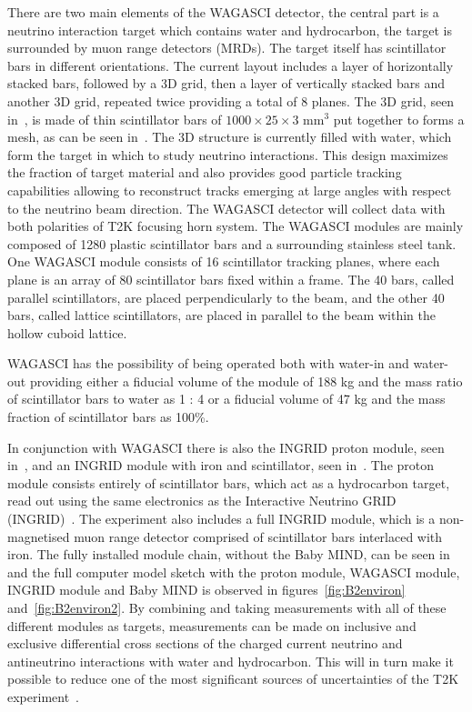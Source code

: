 There are two main elements of the WAGASCI detector, the central part is a neutrino interaction target which contains water and hydrocarbon, the target is surrounded by muon range detectors (MRDs). The target itself has scintillator bars in different orientations. The current layout includes a layer of horizontally stacked bars, followed by a 3D grid, then a layer of vertically stacked bars and another 3D grid, repeated twice providing a total of 8 planes. The 3D grid, seen in~, is made of thin scintillator bars of $1000\times25\times3$ mm$^3$ put together to forms a mesh, as can be seen in~. The 3D structure is currently filled with water, which form the target in which to study neutrino interactions. This design maximizes the fraction of target material and also provides good particle tracking capabilities allowing to reconstruct tracks emerging at large angles with respect to the neutrino beam direction. The WAGASCI detector will collect data with both polarities of T2K focusing horn system. The WAGASCI modules are mainly composed of 1280 plastic scintillator bars and a surrounding stainless steel tank. One WAGASCI module consists of 16 scintillator tracking planes, where each plane is an array of 80 scintillator bars fixed within a frame.
The 40 bars, called parallel scintillators, are placed perpendicularly to the beam, and the other 40 bars, called lattice scintillators, are placed in parallel to the beam within the hollow cuboid lattice.

WAGASCI has the possibility of being operated both with water-in and water-out providing either a fiducial volume of the module of 188 kg and the mass ratio of scintillator bars to water as 1 : 4 or a fiducial volume of 47 kg and the mass fraction of scintillator bars as 100\%.

In conjunction with WAGASCI there is also the INGRID proton module, seen in~, and an INGRID module with iron and scintillator, seen in~. The proton module consists entirely of scintillator bars, which act as a hydrocarbon target, read out using the same electronics as the Interactive Neutrino GRID (INGRID)~\cite{85INGRID}. The experiment also includes a full INGRID module, which is a non-magnetised muon range detector comprised of scintillator bars interlaced with iron. The fully installed module chain, without the Baby MIND, can be seen in~ and the full computer model sketch with the proton module, WAGASCI module, INGRID module and Baby MIND is observed in figures~\ref{fig:B2environ} and~\ref{fig:B2environ2}. By combining and taking measurements with all of these different modules as targets, measurements can be made on  inclusive and exclusive differential cross sections of the charged current neutrino and antineutrino interactions with water and hydrocarbon. This will in turn make it possible to reduce  one of the most significant sources of uncertainties of the T2K experiment~\cite{21T2K}.

